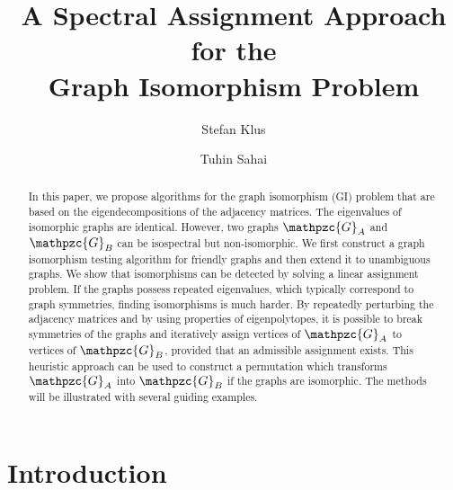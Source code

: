 \documentclass
[
    a4paper,
    DIV=11,
    abstracton
]
{scrartcl}
\title{A Spectral Assignment Approach for the \\ Graph Isomorphism Problem}
\author[1]{Stefan Klus}
\author[2]{Tuhin Sahai}
\affil[1]{\normalsize Department of Mathematics and Computer Science, Freie Universit\"at Berlin, Germany}
\affil[2]{United Technologies Research Center, Berkeley, CA, USA}
\date{}
\newcommand{\mc}[1]{\mathpzc{#1}}
\theoremstyle{definition}
\begin{document}
\maketitle

\begin{abstract}
In this paper, we propose algorithms for the graph isomorphism (GI) problem that are based on the eigendecompositions of the adjacency matrices. The eigenvalues of isomorphic graphs are identical. However, two graphs $ \mc{G}_A $ and $ \mc{G}_B $ can be isospectral but non-isomorphic. We first construct a graph isomorphism testing algorithm for friendly graphs and then extend it to unambiguous graphs. We show that isomorphisms can be detected by solving a linear assignment problem. If the graphs possess repeated eigenvalues, which typically correspond to graph symmetries, finding isomorphisms is much harder. By repeatedly perturbing the adjacency matrices and by using properties of eigenpolytopes, it is possible to break symmetries of the graphs and iteratively assign vertices of $ \mc{G}_A $ to vertices of $ \mc{G}_B $, provided that an admissible assignment exists. This heuristic approach can be used to construct a permutation which transforms $ \mc{G}_A $ into $ \mc{G}_B $ if the graphs are isomorphic. The methods will be illustrated with several guiding examples.
\end{abstract}

\pagestyle{myheadings}
\thispagestyle{plain}

\section{Introduction}
\label{sec:Introduction}
\end{document}

